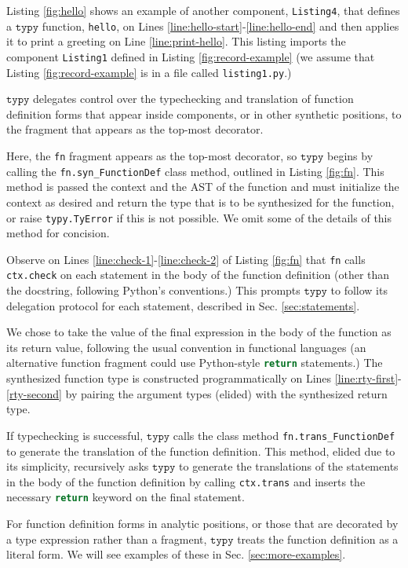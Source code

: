 \documentclass[preprint,10pt]{sigplanconf}
\newcommand{\typy}{\texttt{typy}}
\newcommand{\lip}[1]{\lstinline[language=Python,basicstyle=\ttfamily\footnotesize,deletendkeywords={tuple,buffer,map}]{#1}}
\newcommand{\li}[1]{\lip{#1}}
\begin{document}
Listing \ref{fig:hello} shows an example of another component, \li{Listing4}, that defines a $\typy$ function, \li{hello}, on Lines \ref{line:hello-start}-\ref{line:hello-end} and then applies it to print a greeting on Line \ref{line:print-hello}. This listing imports the component \li{Listing1} defined in Listing \ref{fig:record-example} (we assume that Listing \ref{fig:record-example} is in a file called \li{listing1.py}.)

$\typy$ delegates control over the typechecking and translation of function definition forms that appear inside components, or in other synthetic positions, to the fragment that appears as the top-most decorator.

Here, the \li{fn} fragment appears as the top-most decorator, so $\typy$ begins by calling the \li{fn.syn_FunctionDef} class method, outlined in Listing \ref{fig:fn}. This method is passed the context and the AST of the function and must initialize the context as desired and return the type that is to be synthesized for the function, or raise \li{typy.TyError} if this is not possible. We omit some of the details of this method for concision. 

Observe on Lines \ref{line:check-1}-\ref{line:check-2} of Listing \ref{fig:fn} that \li{fn} calls \li{ctx.check} on each statement in the body of the function definition (other than the docstring, following Python's conventions.) This prompts $\typy$ to follow its delegation protocol for each statement, described in Sec. \ref{sec:statements}. 

We chose to take the value of the final expression in the body of the function as its return value, following the usual convention in functional languages (an alternative function fragment could use Python-style \li{return} statements.) The synthesized function type is constructed programmatically on Lines \ref{line:rty-first}-\ref{rty-second} by pairing the argument types (elided) with the synthesized return type.

If typechecking is successful, $\typy$ calls the class method \li{fn.trans_FunctionDef} to generate the translation of the function definition. This method, elided due to its simplicity, recursively asks $\typy$ to generate the translations of the statements in the body of the function definition by calling \li{ctx.trans} and inserts the necessary \li{return} keyword on the final statement.

For function definition forms in analytic positions, or those that are decorated by a type expression rather than a fragment, $\typy$ treats the function definition as a literal form. We will see examples of these in Sec. \ref{sec:more-examples}. 
\end{document}
